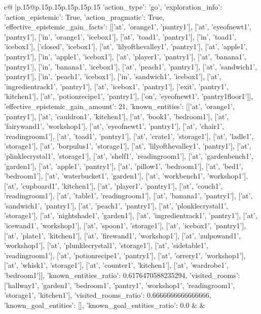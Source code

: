 \documentclass{article}
\begin{document}
{\begin{supertabular}{c@{$\;$}|p{.15\linewidth}@{}p{.15\linewidth}p{.15\linewidth}p{.15\linewidth}p{.15\linewidth}p{.15\linewidth}}
{{{	 {'action_type': 'go', 'exploration_info': {'action_epistemic': True, 'action_pragmatic': True, 'effective_epistemic_gain_facts': [['at', 'orange1', 'pantry1'], ['at', 'eyeofnewt1', 'pantry1'], ['in', 'orange1', 'icebox1'], ['at', 'toad1', 'pantry1'], ['in', 'toad1', 'icebox1'], ['closed', 'icebox1'], ['at', 'lilyofthevalley1', 'pantry1'], ['at', 'apple1', 'pantry1'], ['in', 'apple1', 'icebox1'], ['at', 'player1', 'pantry1'], ['at', 'banana1', 'pantry1'], ['in', 'banana1', 'icebox1'], ['at', 'peach1', 'pantry1'], ['at', 'sandwich1', 'pantry1'], ['in', 'peach1', 'icebox1'], ['in', 'sandwich1', 'icebox1'], ['at', 'ingredientrack1', 'pantry1'], ['at', 'icebox1', 'pantry1'], ['exit', 'pantry1', 'kitchen1'], ['at', 'potionrecipe1', 'pantry1'], ['on', 'eyeofnewt1', 'pantry1floor1']], 'effective_epistemic_gain_amount': 21, 'known_entities': [['at', 'orange1', 'pantry1'], ['at', 'cauldron1', 'kitchen1'], ['at', 'book1', 'bedroom1'], ['at', 'fairywand1', 'workshop1'], ['at', 'eyeofnewt1', 'pantry1'], ['at', 'chair1', 'readingroom1'], ['at', 'toad1', 'pantry1'], ['at', 'crate1', 'storage1'], ['at', 'ladle1', 'storage1'], ['at', 'borpulus1', 'storage1'], ['at', 'lilyofthevalley1', 'pantry1'], ['at', 'plinklecrystal1', 'storage1'], ['at', 'shelf1', 'readingroom1'], ['at', 'gardenbench1', 'garden1'], ['at', 'apple1', 'pantry1'], ['at', 'pillow1', 'bedroom1'], ['at', 'bed1', 'bedroom1'], ['at', 'waterbucket1', 'garden1'], ['at', 'workbench1', 'workshop1'], ['at', 'cupboard1', 'kitchen1'], ['at', 'player1', 'pantry1'], ['at', 'couch1', 'readingroom1'], ['at', 'table1', 'readingroom1'], ['at', 'banana1', 'pantry1'], ['at', 'sandwich1', 'pantry1'], ['at', 'peach1', 'pantry1'], ['at', 'plonklecrystal1', 'storage1'], ['at', 'nightshade1', 'garden1'], ['at', 'ingredientrack1', 'pantry1'], ['at', 'icewand1', 'workshop1'], ['at', 'spoon1', 'storage1'], ['at', 'icebox1', 'pantry1'], ['at', 'plate1', 'kitchen1'], ['at', 'firewand1', 'workshop1'], ['at', 'zulpowand1', 'workshop1'], ['at', 'plunklecrystal1', 'storage1'], ['at', 'sidetable1', 'readingroom1'], ['at', 'potionrecipe1', 'pantry1'], ['at', 'orrery1', 'workshop1'], ['at', 'whisk1', 'storage1'], ['at', 'counter1', 'kitchen1'], ['at', 'wardrobe1', 'bedroom1']], 'known_entities_ratio': 0.6176470588235294, 'visited_rooms': ['hallway1', 'garden1', 'bedroom1', 'pantry1', 'workshop1', 'readingroom1', 'storage1', 'kitchen1'], 'visited_rooms_ratio': 0.6666666666666666, 'known_goal_entities': [], 'known_goal_entities_ratio': 0.0}} 
	  } 
	   } 
	   } 
	 & & \\ 
 


\end{supertabular}}
\end{document}
